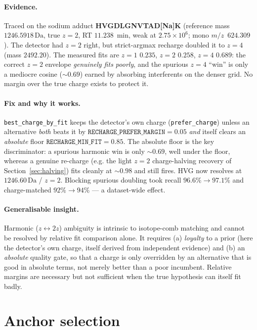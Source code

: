 \documentclass[11pt]{article}
\newcommand{\Da}{\,\text{Da}}
\newcommand{\mz}{\ensuremath{m/z}}
\newcommand{\zeq}[1]{\ensuremath{z{=}#1}}
\begin{document}
\paragraph{Evidence.} Traced on the sodium adduct \textbf{HVGDLGNVTAD[Na]K} (reference mass
$1246.5918\Da$, true \zeq{2}, RT $11.238$~min, weak at $2.75\times10^{6}$; mono \mz\ $624.309$).
The detector had \zeq{2} right, but strict-argmax recharge doubled it to \zeq{4} (mass $2492.20$).
The measured fits are \zeq{1} $0.235$, \zeq{2} $0.258$, \zeq{4} $0.689$: the correct \zeq{2}
envelope \emph{genuinely fits poorly}, and the spurious \zeq{4} ``win'' is only a mediocre cosine
($\sim0.69$) earned by absorbing interferents on the denser grid. No margin over the true charge
exists to protect it.

\paragraph{Fix and why it works.} \texttt{best\_charge\_by\_fit} keeps the detector's own charge
(\texttt{prefer\_charge}) unless an alternative \emph{both} beats it by
$\texttt{RECHARGE\_PREFER\_MARGIN}=0.05$ \emph{and} itself clears an \emph{absolute} floor
$\texttt{RECHARGE\_MIN\_FIT}=0.85$. The absolute floor is the key discriminator: a spurious
harmonic win is only $\sim0.69$, well under the floor, whereas a genuine re-charge (e.g. the light
\zeq{2} charge-halving recovery of Section~\ref{sec:halving}) fits cleanly at $\sim0.98$ and still
fires. HVG now resolves at $1246.60\Da$ / \zeq{2}. Blocking spurious doubling took recall
$96.6\% \rightarrow 97.1\%$ and charge-matched $92\% \rightarrow 94\%$ --- a dataset-wide effect.

\paragraph{Generalisable insight.} Harmonic ($z \leftrightarrow 2z$) ambiguity is intrinsic to
isotope-comb matching and cannot be resolved by relative fit comparison alone. It requires (a)
\emph{loyalty} to a prior (here the detector's own charge, itself derived from independent
evidence) and (b) an \emph{absolute} quality gate, so that a charge is only overridden by an
alternative that is good in absolute terms, not merely better than a poor incumbent. Relative
margins are necessary but not sufficient when the true hypothesis can itself fit badly.

\section{Anchor selection}
\label{sec:anchor}
\end{document}
